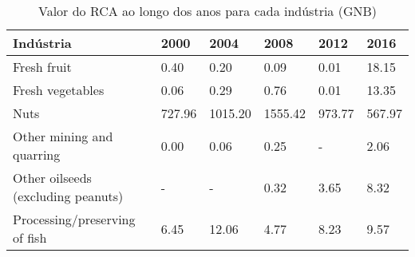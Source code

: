 \begin{table}
\centering
\caption{Valor do RCA ao longo dos anos para cada indústria (GNB)}
\begin{tabular}{p{6cm}p{1.5cm}p{1.5cm}p{1.5cm}p{1.5cm}p{1.5cm}}
\toprule
                         Indústria &   2000 &    2004 &    2008 &   2012 &   2016 \\
\midrule
                       Fresh fruit &   0.40 &    0.20 &    0.09 &   0.01 &  18.15 \\
                  Fresh vegetables &   0.06 &    0.29 &    0.76 &   0.01 &  13.35 \\
                              Nuts & 727.96 & 1015.20 & 1555.42 & 973.77 & 567.97 \\
         Other mining and quarring &   0.00 &    0.06 &    0.25 &      - &   2.06 \\
Other oilseeds (excluding peanuts) &      - &       - &    0.32 &   3.65 &   8.32 \\
     Processing/preserving of fish &   6.45 &   12.06 &    4.77 &   8.23 &   9.57 \\
\bottomrule
\end{tabular}
\end{table}
